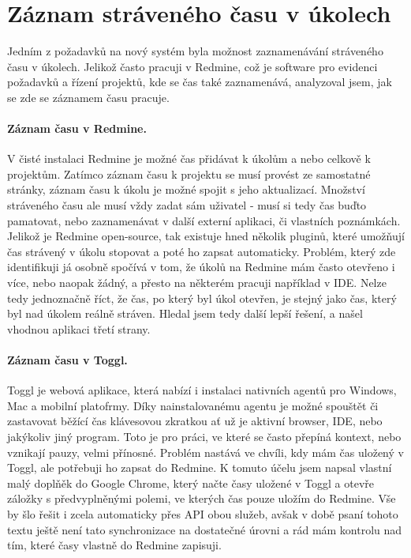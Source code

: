 
\section{Záznam stráveného času v úkolech}\label{implementation:time_tracking}

Jedním z požadavků na nový systém byla možnost zaznamenávání stráveného času v úkolech. Jelikož často pracuji v Redmine, což je software pro evidenci požadavků a řízení projektů, kde se čas také zaznamenává, analyzoval jsem, jak se zde se záznamem času pracuje.

\paragraph{Záznam času v Redmine.} V čisté instalaci Redmine je možné čas přidávat k úkolům a nebo celkově k projektům. Zatímco záznam času k projektu se musí provést ze samostatné stránky, záznam času k úkolu je možné spojit s jeho aktualizací. Množství stráveného času ale musí vždy zadat sám uživatel - musí si tedy čas buďto pamatovat, nebo zaznamenávat v další externí aplikaci, či vlastních poznámkách. Jelikož je Redmine open-source, tak existuje hned několik pluginů, které umožňují čas strávený v úkolu stopovat a poté ho zapsat automaticky. Problém, který zde identifikuji já osobně spočívá v tom, že úkolů na Redmine mám často otevřeno i více, nebo naopak žádný, a přesto na některém pracuji například v IDE. Nelze tedy jednoznačně říct, že čas, po který byl úkol otevřen, je stejný jako čas, který byl nad úkolem reálně stráven. Hledal jsem tedy další lepší řešení, a našel vhodnou aplikaci třetí strany.

\paragraph{Záznam času v Toggl.} Toggl je webová aplikace, která nabízí i instalaci nativních agentů pro Windows, Mac a mobilní platofrmy. Díky nainstalovanému agentu je možné spouštět či zastavovat běžící čas klávesovou zkratkou ať už je aktivní browser, IDE, nebo jakýkoliv jiný program. Toto je pro práci, ve které se často přepíná kontext, nebo vznikají pauzy, velmi přínosné. Problém nastává ve chvíli, kdy mám čas uložený v Toggl, ale potřebuji ho zapsat do Redmine. K tomuto účelu jsem napsal vlastní malý doplňěk do Google Chrome, který načte časy uložené v Toggl a otevře záložky s předvyplněnými polemi, ve kterých čas pouze uložím do Redmine. Vše by šlo řešit i zcela automaticky přes API obou služeb, avšak v době psaní tohoto textu ještě není tato synchronizace na dostatečné úrovni a rád mám kontrolu nad tím, které časy vlastně do Redmine zapisuji.

